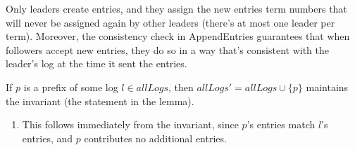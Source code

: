 \begin{sketch}
Only leaders create entries, and they assign the new entries term
numbers that will never be assigned again by other leaders (there's at
most one leader per term).
Moreover, the consistency check in AppendEntries guarantees that when
followers accept new entries, they do so in a way that's consistent with
the leader's log at the time it sent the entries.
\end{sketch}

\begin{assertion}
If $p$ is a prefix of some log $l \in allLogs$, then $allLogs' = allLogs
\cup \{p\}$ maintains the invariant (the statement in the lemma).
\begin{enumerate}
\item This follows immediately from the invariant, since $p$'s entries
match $l$'s entries, and $p$ contributes no additional entries.
\end{enumerate}
\end{assertion}
\vspace{-6ex}

